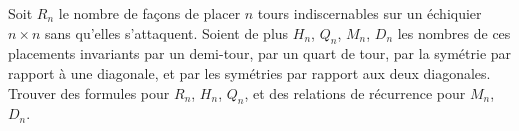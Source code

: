 Soit $R_n$ le nombre de façons de placer $n$ tours indiscernables sur un échiquier $n \times n$ sans qu'elles s'attaquent. Soient de plus $H_n$, $Q_n$, $M_n$, $D_n$ les nombres de ces placements invariants par un demi-tour, par un quart de tour, par la symétrie par rapport à une diagonale, et par les symétries par rapport aux deux diagonales. Trouver des formules pour $R_n$, $H_n$, $Q_n$, et des relations de récurrence pour $M_n$, $D_n$.
